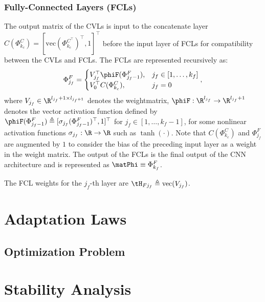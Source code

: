 \documentclass[conference]{IEEEtran}
\begin{document}
\subsubsection{Fully-Connected Layers (FCLs)}
The output matrix of the CVLs is input to the concatenate layer
$C(\Phi_{k_c}^{C}) = [\text{vec}(\Phi_{k_c}^{C^{\top}})^{\top}, 1]^{\top}$
before the input layer of FCLs for compatibility between the CVLs and FCLs.
The FCLs are represented recursively as:
\begin{equation} \label{eq:fcl_output}
    \Phi_{j_f}^{F} 
    = 
    \begin{cases} 
        V_{j_f}^{\top}\phiF(\Phi_{j_f-1}^{F}), & j_f \in [1,\dots,k_f] 
        \\ 
        V_{0}^{\top}C(\Phi_{k_c}^{C}), 
        & 
        j_f = 0 
    \end{cases}
    ,
\end{equation}
where 
$V_{j_f} \in \R^{l_{j_f}+1 \times l_{j_f+1}}$ denotes the weightmatrix, 
$\phiF: \R^{l_{j_f}} \to \R^{l_{j_f}+1}$ denotes the vector activation function defined by $\phiF(\Phi_{j_f-1}^{F}) \triangleq [\sigma_{j_f}(\Phi_{j_f-1}^{F})^\top, 1]^\top$ for $j_f \in [1,\dots,k_f-1]$, for some nonlinear activation functions $\sigma_{j_f}: \R \to \R$ such as $\tanh(\cdot)$. 
Note that $C(\Phi_{k_c}^{C})$ and $\Phi_{j_f}^{F}$ are augmented by $1$ to consider the bias of the preceding input layer as a weight in the weight matrix. The output of the FCLs is the final output of the CNN architecture and is represented as $\matPhi \equiv \Phi_{k_f}^{F}$.

The FCL weights for the $j_f$-th layer are $\tH_{Fj_f} \triangleq \text{vec}(V_{j_f})$.

\section{Adaptation Laws}
\subsection{Optimization Problem}

\section{Stability Analysis}
\end{document}
